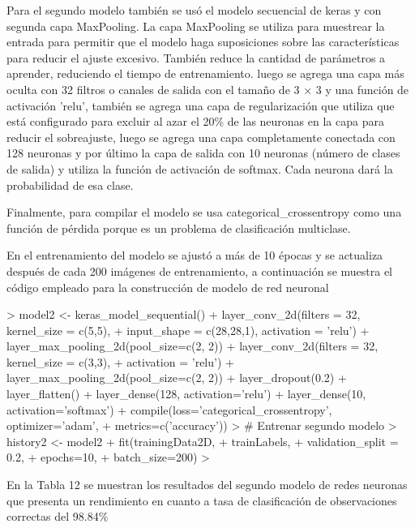 \documentclass{article}
\begin{document}

Para el segundo modelo también se usó el modelo secuencial de keras y con segunda capa MaxPooling. La capa MaxPooling se utiliza para muestrear la entrada para permitir que el modelo haga suposiciones sobre las características para reducir el ajuste excesivo. También reduce la cantidad de parámetros a aprender, reduciendo el tiempo de entrenamiento. luego se agrega una capa más oculta con 32 filtros o canales de salida con el tamaño de 3 × 3 y una función de activación 'relu', también se agrega una capa de regularización que utiliza que está configurado para excluir al azar el 20\% de las neuronas en la capa para reducir el sobreajuste, luego se agrega una capa completamente conectada con 128 neuronas y por último la capa de salida con 10 neuronas (número de clases de salida) y utiliza la función de activación de softmax. Cada neurona dará la probabilidad de esa clase.

Finalmente, para compilar el modelo se usa categorical\_crossentropy como una función de pérdida porque es un problema de clasificación multiclase.

En el entrenamiento del modelo se ajustó a más de 10 épocas y se actualiza después de cada 200 imágenes de entrenamiento, a continuación se muestra el código empleado para la construcción de modelo de red neuronal



\begin{Schunk}
\begin{Sinput}
> model2 <- keras_model_sequential() %
+   layer_conv_2d(filters = 32, kernel_size = c(5,5), 
+                 input_shape = c(28,28,1), activation = 'relu') %
+   layer_max_pooling_2d(pool_size=c(2, 2)) %
+   layer_conv_2d(filters = 32, kernel_size = c(3,3), 
+                 activation = 'relu') %
+   layer_max_pooling_2d(pool_size=c(2, 2)) %
+   layer_dropout(0.2) %
+   layer_flatten() %
+   layer_dense(128, activation='relu') %
+   layer_dense(10, activation='softmax') %
+   compile(loss='categorical_crossentropy', optimizer='adam',
+           metrics=c('accuracy'))
> # Entrenar segundo modelo
> history2 <- model2 %
+   fit(trainingData2D,
+       trainLabels,
+       validation_split = 0.2,
+       epochs=10,
+       batch_size=200)
> 
\end{Sinput}
\end{Schunk}

En la Tabla 12 se muestran los resultados del segundo modelo de redes neuronas que presenta un rendimiento en cuanto a tasa de clasificación de observaciones correctas del  98.84\%
\end{document}
